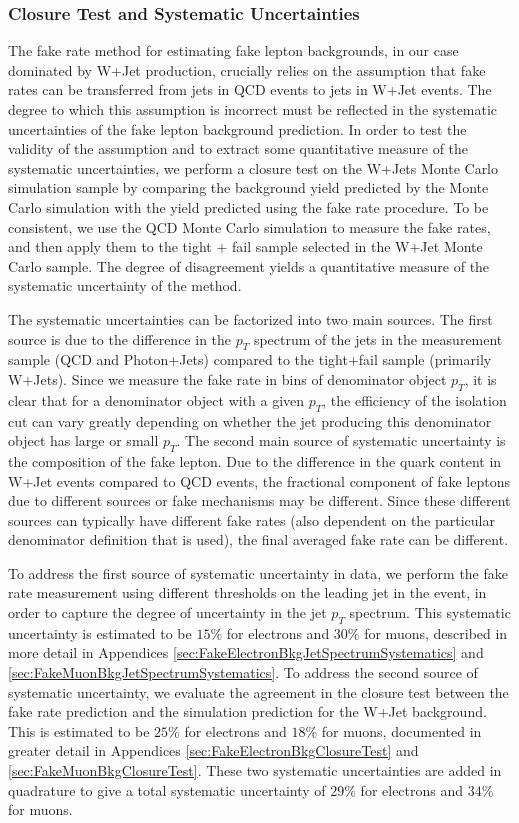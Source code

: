 \subsubsection{Closure Test and Systematic Uncertainties}
\label{sec:fakerateSystematics}

The fake rate method for estimating fake lepton backgrounds, in our case
dominated by W+Jet production, crucially relies on the assumption that
fake rates can be transferred from jets in QCD events to jets in W+Jet
events. The degree to which this assumption is incorrect must be 
reflected in the systematic uncertainties of the fake lepton 
background prediction. In order to test the validity of the assumption
and to extract some quantitative measure of the systematic uncertainties,
we perform a closure test on the W+Jets Monte Carlo simulation sample by 
comparing the background yield predicted by the Monte Carlo simulation
with the yield predicted using the fake rate procedure. To be consistent,
we use the QCD Monte Carlo simulation to measure the fake rates, and then
apply them to the tight + fail sample selected in the W+Jet Monte Carlo
sample. The degree of disagreement yields a quantitative measure of the 
systematic uncertainty of the method. 

The systematic uncertainties can be factorized into two main sources. 
The first source is due to the difference in the $p_{T}$ spectrum 
of the jets in the measurement sample (QCD and Photon+Jets) compared
to the tight+fail sample (primarily W+Jets). Since we measure the 
fake rate in bins of denominator object $p_{T}$, it is clear that
for a denominator object with a given $p_{T}$, the efficiency of the
isolation cut can vary greatly depending on whether the jet producing
this denominator object has large or small $p_{T}$. The second main
source of systematic uncertainty is the composition of the fake lepton.
Due to the difference in the quark content in W+Jet events compared
to QCD events, the fractional component of fake leptons due to different 
sources or fake mechanisms may be different. Since these different sources
can typically have different fake rates (also dependent on the particular 
denominator definition that is used), the final averaged fake rate can 
be different.

To address the first source of systematic uncertainty in data, we perform the
fake rate measurement using different thresholds on the leading jet
in the event, in order to capture the degree of uncertainty in 
the jet $p_{T}$ spectrum. This systematic uncertainty is estimated to 
be $15\%$ for electrons and $30\%$ for muons, described in more detail in Appendices 
\ref{sec:FakeElectronBkgJetSpectrumSystematics} and 
\ref{sec:FakeMuonBkgJetSpectrumSystematics}. To address the second 
source of systematic uncertainty, we evaluate the agreement in the closure
test between the fake rate prediction and the simulation prediction for 
the W+Jet background. This is estimated to be $25\%$ for electrons
and $18\%$ for muons, documented in greater 
detail in Appendices \ref{sec:FakeElectronBkgClosureTest} and
\ref{sec:FakeMuonBkgClosureTest}. These two 
systematic uncertainties are added in quadrature to give a total 
systematic uncertainty of $29\%$ for electrons and $34\%$ for muons. 


